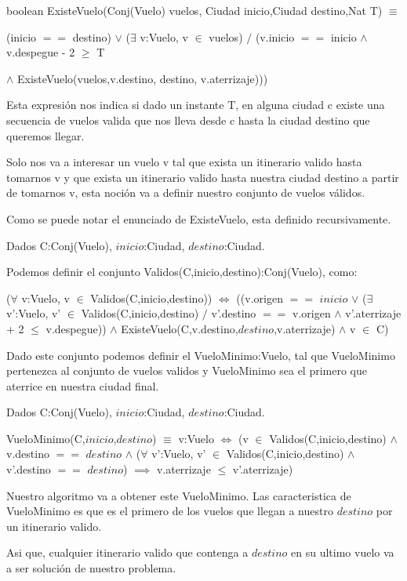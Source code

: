 boolean ExisteVuelo(Conj(Vuelo) vuelos, Ciudad inicio,Ciudad destino,Nat T) $\equiv$

(inicio $==$ destino) $\vee$ ($\exists$ v:Vuelo, v $\in$ vuelos) $/$ (v.inicio $==$ inicio $\wedge$ v.despegue - 2 $\geq$ T 

$\wedge$ ExisteVuelo(vuelos,v.destino, destino, v.aterrizaje))) 

Esta expresi\'on nos indica si dado un instante T, en alguna ciudad c existe una secuencia de vuelos valida que nos lleva desde c hasta la ciudad destino que queremos llegar.

Solo nos va a interesar un vuelo v tal que exista un itinerario valido hasta tomarnos v y que exista un itinerario valido hasta nuestra ciudad destino a partir de tomarnos v, esta noci\'on va a definir nuestro conjunto de vuelos v\'alidos.

Como se puede notar el enunciado de ExisteVuelo, esta definido recursivamente.

Dados C:Conj(Vuelo), $inicio$:Ciudad, $destino$:Ciudad.

Podemos definir el conjunto Validos(C,inicio,destino):Conj(Vuelo), como:

($\forall$ v:Vuelo, v $\in$ Validos(C,inicio,destino)) $\Leftrightarrow$ ((v.origen $==$ $inicio$ $\vee$ ($\exists$ v':Vuelo, v' $\in$ Validos(C,inicio,destino) $/$ v'.destino $==$ v.origen $\wedge$ v'.aterrizaje + 2 $\leq$ v.despegue)) $\wedge$ ExisteVuelo(C,v.destino,$destino$,v.aterrizaje) $\wedge$ v $\in$ C)

Dado este conjunto podemos definir el VueloMinimo:Vuelo, tal que VueloMinimo pertenezca al conjunto de vuelos validos y VueloMinimo sea el primero que aterrice en nuestra ciudad final.

Dados C:Conj(Vuelo), $inicio$:Ciudad, $destino$:Ciudad.

VueloMinimo(C,$inicio$,$destino$) $\equiv$ v:Vuelo $\Leftrightarrow$ (v $\in$ Validos(C,inicio,destino) $\wedge$ v.destino $==$ $destino$ $\wedge$ ($\forall$ v':Vuelo, v' $\in$ Validos(C,inicio,destino) $\wedge$ v'.destino $==$ $destino$) $\implies$ v.aterrizaje $\leq$ v'.aterrizaje)

Nuestro algoritmo va a obtener este VueloMinimo. Las caracteristica de VueloMinimo es que es el primero de los vuelos que llegan a nuestro $destino$ por un itinerario valido.

Asi que, cualquier itinerario valido que contenga a $destino$ en su ultimo vuelo va a ser soluci\'on de nuestro problema.

